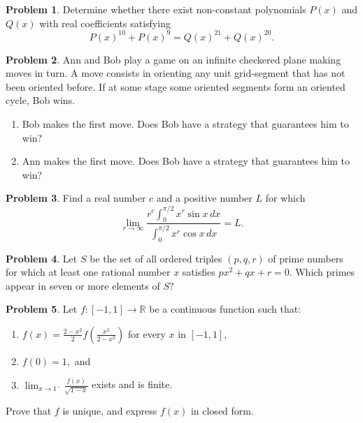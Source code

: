 \documentclass{scrartcl}
\theoremstyle{definition}
\newtheorem{prob}{Problem}
\begin{document}
	\begin{prob}%
		Determine whether there exist non-constant polynomials $P\left(x\right)$ and $Q\left(x\right)$ with real coefficients satisfying \[P\left(x\right)^{10}+P\left(x\right)^9=Q\left(x\right)^{21}+Q\left(x\right)^{20}.\]
	\end{prob}

	\begin{prob}%
		Ann and Bob play a game on an infinite checkered plane making moves in turn. A move consists in orienting any unit grid-segment that has not been oriented before. If at some stage some oriented segments form an oriented cycle, Bob wins.
		\begin{enumerate}[label = (\alph*)]
			\item Bob makes the first move. Does Bob have a strategy that guarantees him to win?
			\item Ann makes the first move. Does Bob have a strategy that guarantees him to win?
		\end{enumerate}
	\end{prob}

	\setcounter{prob}{15}
	\begin{prob}%
		Find a real number $c$ and a positive number $L$ for which
		\[\lim_{r\to\infty}\frac{r^c\int_0^{\pi/2}x^r\sin x\,dx}{\int_0^{\pi/2}x^r\cos x\,dx}=L.\]
	\end{prob}

	\setcounter{prob}{17}
	\begin{prob}%
		Let $S$ be the set of all ordered triples $(p,q,r)$ of prime numbers for which at least one rational number $x$ satisfies $px^2+qx+r=0.$ Which primes appear in seven or more elements of $S?$
	\end{prob}

	\setcounter{prob}{18}
	\begin{prob}
	Let $f:[-1,1]\to\mathbb{R}$ be a continuous function such that:
	\begin{enumerate}[label = \textbullet, itemsep = -.25em]
		\item $f(x)=\frac{2-x^2}{2}f\left(\frac{x^2}{2-x^2}\right)$ for every $x$ in $[-1,1],$
		\item $ f(0)=1,$ and
		\item $\lim_{x\to 1^-}\frac{f(x)}{\sqrt{1-x}}$ exists and is finite.
	\end{enumerate}

	Prove that $f$ is unique, and express $f(x)$ in closed form.
	\end{prob}
\end{document}
